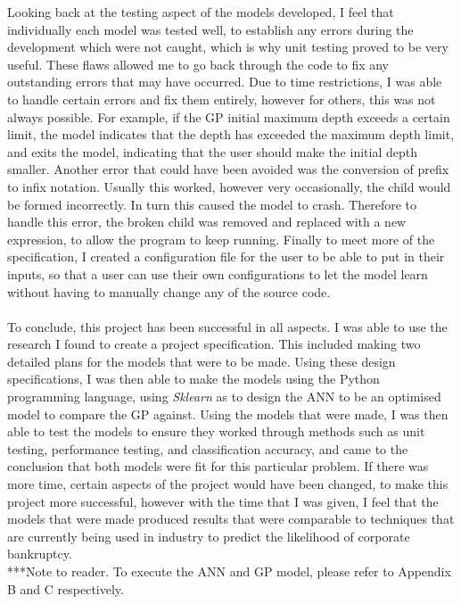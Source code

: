 \documentclass[11pt]{article}
\begin{document}
Looking back at the testing aspect of the models developed, I feel that individually each model was tested well, to establish any errors during the development which were not caught, which is why unit testing proved to be very useful. These flaws allowed me to go back through the code to fix any outstanding errors that may have occurred. Due to time restrictions, I was able to handle certain errors and fix them entirely, however for others, this was not always  possible. For example, if the GP initial maximum depth exceeds a certain limit, the model indicates that the depth has exceeded the maximum depth limit, and exits the model, indicating that the user should make the initial depth smaller. Another error that could have been avoided was the conversion of prefix to infix notation. Usually this worked, however very occasionally, the child would be formed incorrectly. In turn this caused the model to crash. Therefore to handle this error, the broken child was removed and replaced with a new expression, to allow the program to keep running. Finally to meet more of the specification, I created a configuration file for the user to be able to put in their inputs, so that a user can use their own configurations to let the model learn without having to manually change any of the source code. 
\\\\
To conclude, this project has been successful in all aspects. I was able to use the research I found to create a project specification. This included making two detailed plans for the models that were to be made. Using these design specifications, I was then able to make the models using the Python programming language, using \textit{Sklearn} as to design the ANN to be an optimised model to compare the GP against. Using the models that were made, I was then able to test the models to ensure they worked through methods such as unit testing, performance testing, and classification accuracy, and came to the conclusion that both models were fit for this particular problem. If there was more time, certain aspects of the project would have been changed, to make this project more successful, however with the time that I was given, I feel that the models that were made produced results that were comparable to techniques that are currently being used in industry to predict the likelihood of corporate bankruptcy. \\
***Note to reader. To execute the ANN and GP model, please refer to Appendix B and C respectively. 
\cleardoublepage


\cleardoublepage
\end{document}
